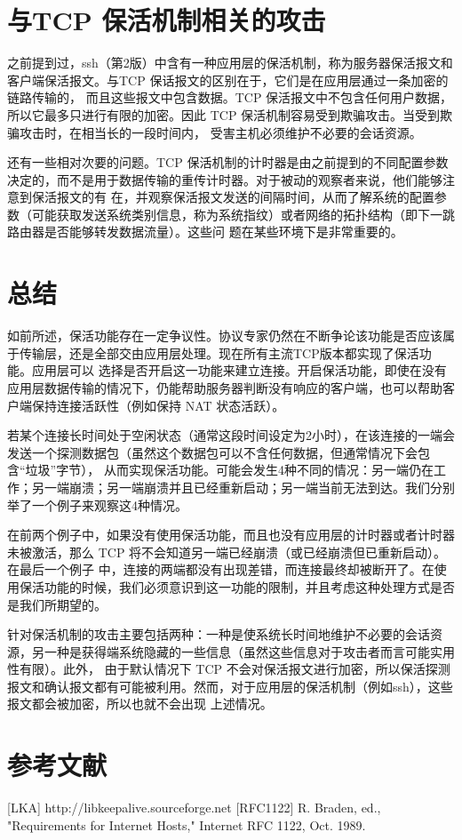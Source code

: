 \section{与TCP 保活机制相关的攻击}
之前提到过，ssh（第2版）中含有一种应用层的保活机制，称为服务器保活报文和客户端保活报文。与TCP 保话报文的区别在于，它们是在应用层通过一条加密的链路传输的，
而且这些报文中包含数据。TCP 保活报文中不包含任何用户数据，所以它最多只进行有限的加密。因此 TCP 保活机制容易受到欺骗攻击。当受到欺骗攻击时，在相当长的一段时间内，
受害主机必须维护不必要的会话资源。

还有一些相对次要的问题。TCP 保活机制的计时器是由之前提到的不同配置参数决定的，而不是用于数据传输的重传计时器。对于被动的观察者来说，他们能够注意到保活报文的有
在，并观察保活报文发送的间隔时间，从而了解系统的配置参数（可能获取发送系统类别信息，称为系统指纹）或者网络的拓扑结构（即下一跳路由器是否能够转发数据流量）。这些问
题在某些环境下是非常重要的。

\section{总结}
如前所述，保活功能存在一定争议性。协议专家仍然在不断争论该功能是否应该属于传输层，还是全部交由应用层处理。现在所有主流TCP版本都实现了保活功能。应用层可以
选择是否开启这一功能来建立连接。开启保活功能，即使在没有应用层数据传输的情况下，仍能帮助服务器判断没有响应的客户端，也可以帮助客户端保持连接活跃性（例如保持 NAT
状态活跃）。

若某个连接长时间处于空闲状态（通常这段时间设定为2小时），在该连接的一端会发送一个探测数据包（虽然这个数据包可以不含任何数据，但通常情况下会包含“垃圾”字节），
从而实现保活功能。可能会发生4种不同的情况：另一端仍在工作；另一端崩溃；另一端崩溃并且已经重新启动；另一端当前无法到达。我们分别举了一个例子来观察这4种情况。

在前两个例子中，如果没有使用保活功能，而且也没有应用层的计时器或者计时器未被激活，那么 TCP 将不会知道另一端已经崩溃（或已经崩溃但已重新启动）。在最后一个例子
中，连接的两端都没有出现差错，而连接最终却被断开了。在使用保活功能的时候，我们必须意识到这一功能的限制，并且考虑这种处理方式是否是我们所期望的。

针对保活机制的攻击主要包括两种：一种是使系统长时间地维护不必要的会话资源，另一种是获得端系统隐藏的一些信息（虽然这些信息对于攻击者而言可能实用性有限）。此外，
由于默认情况下 TCP 不会对保活报文进行加密，所以保活探测报文和确认报文都有可能被利用。然而，对于应用层的保活机制（例如ssh），这些报文都会被加密，所以也就不会出现
上述情况。

\section{参考文献}
[LKA] http://libkeepalive.sourceforge.net
[RFC1122] R. Braden, ed., "Requirements for Internet Hosts," Internet RFC 1122, Oct. 1989.
